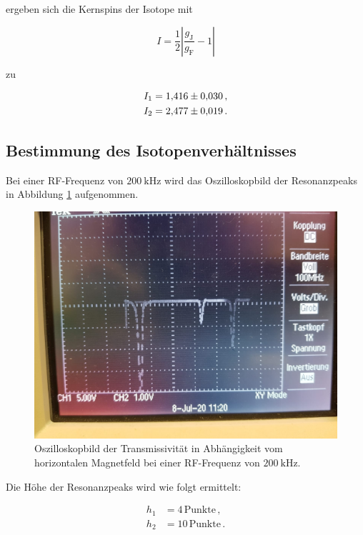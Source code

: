 ergeben sich die Kernspins der Isotope mit 

\begin{equation*}
  I = \frac{1}{2}\left|\frac{g_\text{J}}{g_\text{F}}-1\right|
\end{equation*}

zu 

\begin{align*}
  I_1 &= \num{1.416\pm 0.030}\,,\\
  I_2 &= \num{2.477\pm 0.019}\,.
\end{align*}

\subsection{Bestimmung des Isotopenverhältnisses}

Bei einer RF-Frequenz von $\SI{200}{\kilo\hertz}$ wird das Oszilloskopbild der Resonanzpeaks in Abbildung \ref{fig:iso} aufgenommen.

\begin{figure}
  \centering
  \includegraphics[scale=0.2]{content/iso.jpeg}
  \caption{Oszilloskopbild der Transmissivität in Abhängigkeit vom horizontalen Magnetfeld bei einer RF-Frequenz von $\SI{200}{\kilo\hertz}$.}
  \label{fig:iso}
\end{figure}

Die Höhe der Resonanzpeaks wird wie folgt ermittelt: 

\begin{align*}
  h_1 &= 4 \,\text{Punkte}\,,\\
  h_2 &= 10 \,\text{Punkte}\,.
\end{align*}

